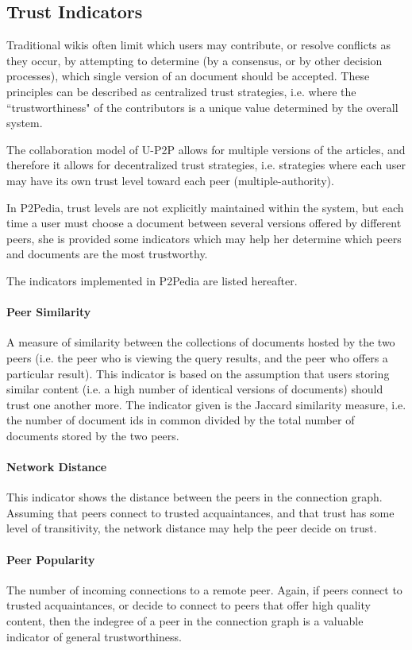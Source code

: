 \subsection{Trust Indicators}
\label{sec:trust}

Traditional wikis often limit which users may contribute, or resolve conflicts as they occur, by attempting to determine (by a consensus, or by other decision processes), which single version of an document should be accepted. These principles can be described as centralized trust strategies, i.e. where the ``trustworthiness" of the contributors is a unique value determined by the overall system.

The collaboration model of U-P2P allows for multiple versions of the articles, and therefore it allows for decentralized trust strategies, i.e. strategies where each user may have its own trust level toward each peer (multiple-authority).

In P2Pedia, trust levels are not explicitly maintained within the system, but each time a user must choose a document between several versions offered by different peers, she is provided some indicators which may help her determine which peers and documents are the most trustworthy.

The indicators implemented in P2Pedia are listed hereafter.

\paragraph*{Peer Similarity} A measure of similarity between the collections of documents hosted by the two peers (i.e. the peer who is viewing the query results, and the peer who offers a particular result). This indicator is based on the assumption that users storing similar content (i.e. a high number of identical versions of documents) should trust one another more. The indicator given is the Jaccard similarity measure, i.e. the number of document ids in common divided by the total number of documents stored by the two peers.
\paragraph*{Network Distance} This indicator shows the distance between the peers in the connection graph. Assuming that peers connect to trusted acquaintances, and that trust has some level of transitivity, the network distance may help the peer decide on trust.
\paragraph*{Peer Popularity} The number of incoming connections to a remote peer. Again, if peers connect to trusted acquaintances, or decide to connect to peers that offer high quality content, then the indegree of a peer in the connection graph is a valuable indicator of general trustworthiness.
